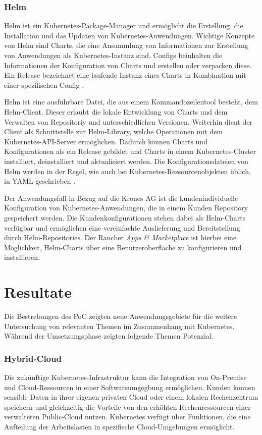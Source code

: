 \subsubsection{Helm}
Helm ist ein Kubernetes-Package-Manager und ermöglicht die Erstellung, die Installation und das Updaten von Kubernetes-Anwendungen.
Wichtige Konzepte von Helm sind Charts, die eine Ansammlung von Informationen zur Erstellung von Anwendungen als Kubernetes-Instanz sind. 
Configs beinhalten die Informationen der Konfiguration von Charts und erstellen oder verpacken diese.
Ein Release bezeichnet eine laufende Instanz eines Charts in Kombination mit einer spezifischen Config \cite{helm}.

Helm ist eine ausführbare Datei, die aus einem Kommandozeilentool besteht, dem Helm-Client.
Dieser erlaubt die lokale Entwicklung von Charts und dem Verwalten von Repositoriy und unterschiedlichen Versionen.
Weiterhin dient der Client als Schnittstelle zur Helm-Library, welche Operationen mit dem Kubernetes-API-Server ermöglichen.
Dadurch können Charts und Konfigurationen als ein Release gebildet
und Charts in einem Kubernetes-Cluster installiert, deinstalliert und aktualisiert werden.
Die Konfigurationsdateien von Helm werden in der Regel, wie auch bei Kubernetes-Ressourcenobjekten üblich, in YAML geschrieben \cite{helm}.

Der Anwendungsfall in Bezug auf die Krones AG ist die kundenindividuelle Konfiguration von Kubernetes-Anwendungen, die in einem Kunden Repository gespeichert werden.
Die Kundenkonfigurationen stehen dabei als Helm-Charts verfügbar und ermöglichen eine vereinfachte Auslieferung und Bereitstellung durch Helm-Repositories.
Der Rancher \textit{Apps \& Marketplace} ist hierbei eine Möglichkeit, Helm-Charts über eine Benutzeroberfläche zu konfigurieren und installieren.

\newpage

\section{Resultate}
Die Bestrebungen des PoC zeigten neue Anwendungsgebiete für die weitere Untersuchung von relevanten Themen im Zusammenhang mit Kubernetes.
Während der Umsetzungsphase zeigten folgende Themen Potenzial.

\subsubsection{Hybrid-Cloud}
Die zukünftige Kubernetes-Infrastruktur kann die Integration von On-Premise und Cloud-Ressourcen in einer Softwareumgegbung ermöglichen.
Kunden können sensible Daten in ihrer eigenen privaten Cloud oder einem lokalen Rechenzentrum speichern und gleichzeitig die
Vorteile von den erhöhten Rechenressourcen einer verwalteten Public-Cloud nutzen.
Kubernetes verfügt über Funktionen, die eine Aufteilung der Arbeitslasten in spezifische Cloud-Umgebungen ermöglicht.

